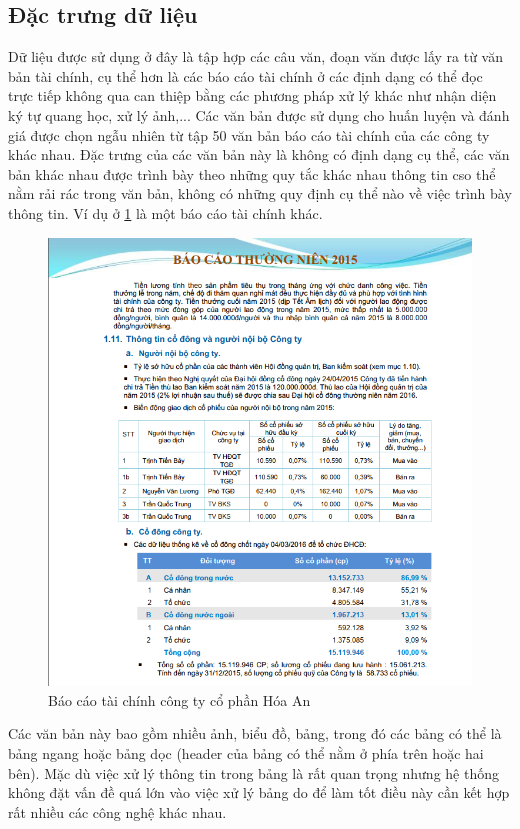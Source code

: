 \documentclass[14pt]{extreport}
\begin{document}
\subsection{Đặc trưng dữ liệu}
Dữ liệu được sử dụng ở đây là tập hợp các câu văn, đoạn văn được lấy ra từ văn bản tài chính, cụ thể hơn là các báo cáo tài chính ở các định dạng có thể đọc trực tiếp không qua can thiệp bằng các phương pháp xử lý khác như nhận diện ký tự quang học, xử lý ảnh,... Các văn bản được sử dụng cho huấn luyện và đánh giá được chọn ngẫu nhiên từ tập 50 văn bản báo cáo tài chính của các công ty khác nhau. Đặc trưng của các văn bản này là không có định dạng cụ thể, các văn bản khác nhau được trình bày theo những quy tắc khác nhau thông tin cso thể nằm rải rác trong văn bản, không có những quy định cụ thể nào về việc trình bày thông tin. Ví dụ ở \ref{fig:sub2} là một báo cáo tài chính khác.
\begin{figure}
\centering
  \includegraphics[width=1\linewidth]{image/baocao2.PNG}
  \caption{Báo cáo tài chính công ty cổ phần Hóa An}
  \label{fig:sub2}
\end{figure}
Các văn bản này bao gồm nhiều ảnh, biểu đồ, bảng, trong đó các bảng có thể là bảng ngang hoặc bảng dọc (header của bảng có thể nằm ở phía trên hoặc hai bên). Mặc dù việc xử lý thông tin trong bảng là rất quan trọng nhưng hệ thống không đặt vấn đề quá lớn vào việc xử lý bảng do để làm tốt điều này cần kết hợp rất nhiều các công nghệ khác nhau.
\end{document}
